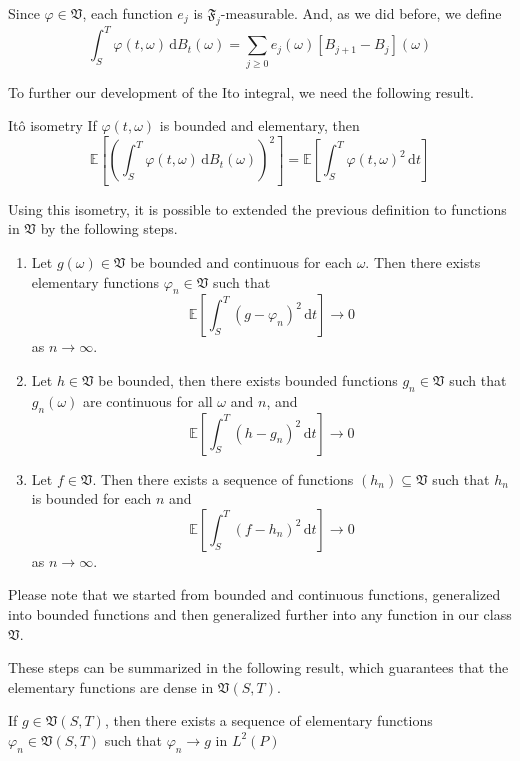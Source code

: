 Since $\varphi \in \mathfrak{V}$, each function $e_j$ is $\mathfrak{F}_j$-measurable. And, as we did before, we define
\[
	\int_S^T \varphi (t, \omega) \, \mathrm{d}B_t(\omega) = \sum_{j \geq 0} e_j(\omega) [B_{j+1} - B_j](\omega)
\]

To further our development of the Ito integral, we need the following result.

\begin{theorem}[]{Itô isometry}{}
	If $\varphi(t, \omega)$ is bounded and elementary, then
	\[
		\mathbb{E}\left[\left( \int_S^T \varphi(t,\omega) \, \mathrm{d}B_t(\omega) \right)^2 \right] = \mathbb{E} \left[\int_S^T \varphi(t,\omega)^2 \, \mathrm{d}t \right]
	\]
\end{theorem}

Using this isometry, it is possible to extended the previous definition to functions in $\mathfrak{V}$ by the following steps.

\begin{enumerate}
	\item Let $g(\omega) \in \mathfrak{V}$ be bounded and continuous for each $\omega$. Then there exists elementary functions $\varphi_n \in \mathfrak{V}$ such that
	\[
		\mathbb{E} \left[ \int_S^T (g-\varphi_n)^2 \, \mathrm{d}t \right] \longrightarrow 0
	\]
	as $n \to \infty$.
	\item Let $h \in \mathfrak{V}$ be bounded, then there exists bounded functions $g_n \in \mathfrak{V}$ such that $g_n (\omega)$ are continuous for all $\omega$ and $n$, and
	\[
		\mathbb{E} \left[ \int_S^T (h-g_n)^2 \, \mathrm{d}t \right] \longrightarrow 0
	\]
	\item Let $f \in \mathfrak{V}$. Then there exists a sequence of functions $(h_n) \subseteq \mathfrak{V}$ such that $h_n$ is bounded for each $n$ and 
	\[
		\mathbb{E} \left[ \int_S^T (f-h_n)^2 \, \mathrm{d}t \right] \longrightarrow 0
	\]
	as $n \to \infty$.
\end{enumerate}

Please note that we started from bounded and continuous functions, generalized into bounded functions and then generalized further into any function in our class $\mathfrak{V}$.

These steps can be summarized in the following result, which guarantees that the elementary functions are dense in $\mathfrak{V}(S,T)$.

\begin{theorem}[]{}{}
If $g\in \mathfrak{V}(S,T)$, then there exists a sequence of elementary functions $\varphi_n\in \mathfrak{V}(S,T)$ such that $\varphi_n\to g$ in $L^2(P)$
\end{theorem}

